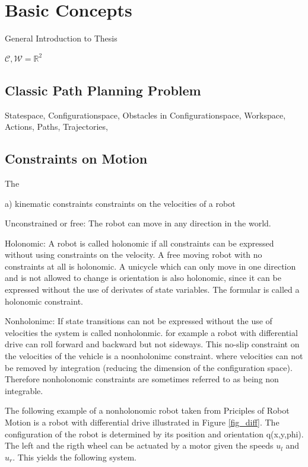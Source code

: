 \chapter{Basic Concepts}\label{ch:introductionplanning}
General Introduction to Thesis

$\mathcal{C,W} = \mathbb{R}^2$

\section{Classic Path Planning Problem}\label{sec:basic}
Statespace,
Configurationspace,
Obstacles in Configurationspace,
Workspace,
Actions,
Paths,
Trajectories,

\section{Constraints on Motion}\label{sec:model}
The 

a) kinematic constraints
constraints on the velocities of a robot

Unconstrained or free:
The robot can move in any direction in the world. 

Holonomic:
A robot is called holonomic if all constraints can be expressed without using constraints on the velocity. 
A free moving robot with no constraints at all is holonomic.
A unicycle which can only move in one direction and is not allowed to change is orientation is also holonomic, since  it can be expressed without the use of derivates of state variables.
The formular is called a holonomic constraint.

Nonholonimc:
If state transitions can not be expressed without the use of velocities the system is called nonholonmic.
for example a robot with differential drive can roll forward and backward but not sideways. 
This no-slip constraint on the velocities of the vehicle is a noonholonimc constraint.
where velocities can not be removed by integration (reducing the dimension of the configuration space).
Therefore nonholonomic constraints are sometimes referred to as being non integrable.


The following example of a nonholonomic robot taken from Priciples of Robot Motion is a robot with differential drive illustrated in Figure \ref{fig_diff}.
The configuration of the robot is determined by its position and orientation q(x,y,phi).
The left and the rigth wheel can be actuated by a motor given the speeds $u_l$ and $u_r$.
This yields the following system.


